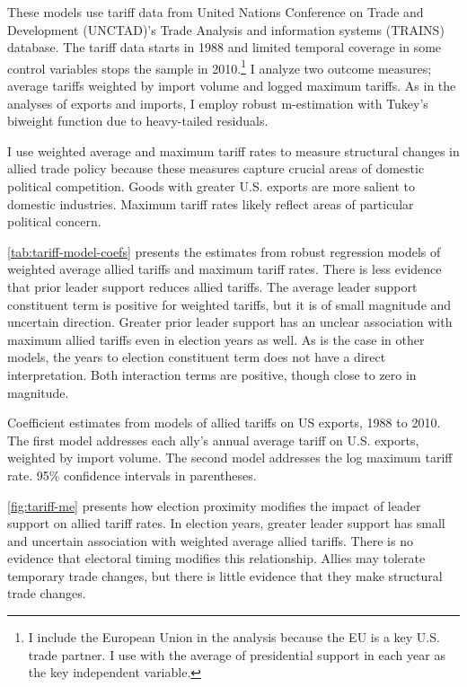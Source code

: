 \documentclass[12pt]{article}
\begin{document}
These models use tariff data from United Nations Conference on Trade and Development (UNCTAD)'s Trade Analysis and information systems (TRAINS) database. 
The tariff data starts in 1988 and limited temporal coverage in some control variables stops the sample in 2010.\footnote{I include the European Union in the analysis because the EU is a key U.S. trade partner. I use with the average of presidential support in each year as the key independent variable.}
I analyze two outcome measures; average tariffs weighted by import volume and logged maximum tariffs. 
As in the analyses of exports and imports, I employ robust m-estimation with Tukey's biweight function due to heavy-tailed residuals.


I use weighted average and maximum tariff rates to measure structural changes in allied trade policy because these measures capture crucial areas of domestic political competition.
Goods with greater U.S. exports are more salient to domestic industries. 
Maximum tariff rates likely reflect areas of particular political concern.


\autoref{tab:tariff-model-coefs} presents the estimates from robust regression models of weighted average allied tariffs and maximum tariff rates. 
There is less evidence that prior leader support reduces allied tariffs. 
The average leader support constituent term is positive for weighted tariffs, but it is of small magnitude and uncertain direction.
Greater prior leader support has an unclear association with maximum allied tariffs even in election years as well.
As is the case in other models, the years to election constituent term does not have a direct interpretation.
Both interaction terms are positive, though close to zero in magnitude. 


\begin{table}
\centering

	\caption{Coefficient estimates from models of allied tariffs on US exports, 1988 to 2010. The first model addresses each ally's annual average tariff on U.S. exports, weighted by import volume. The second model addresses the log maximum tariff rate. 95\% confidence intervals in parentheses.}
	\label{tab:tariff-model-coefs}
\end{table}


\autoref{fig:tariff-me} presents how election proximity modifies the impact of leader support on allied tariff rates.
In election years, greater leader support has small and uncertain association with weighted average allied tariffs. 
There is no evidence that electoral timing modifies this relationship.
Allies may tolerate temporary trade changes, but there is little evidence that they make structural trade changes.
\end{document}
